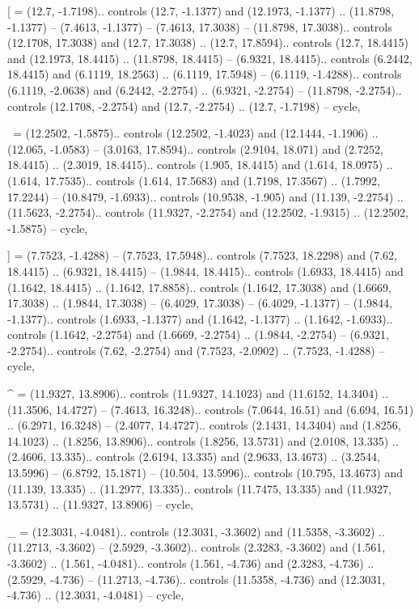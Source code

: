 [ = {(12.7, -1.7198).. controls (12.7, -1.1377) and (12.1973, -1.1377) .. (11.8798, -1.1377) -- (7.4613, -1.1377) -- (7.4613, 17.3038) -- (11.8798, 17.3038).. controls (12.1708, 17.3038) and (12.7, 17.3038) .. (12.7, 17.8594).. controls (12.7, 18.4415) and (12.1973, 18.4415) .. (11.8798, 18.4415) -- (6.9321, 18.4415).. controls (6.2442, 18.4415) and (6.1119, 18.2563) .. (6.1119, 17.5948) -- (6.1119, -1.4288).. controls (6.1119, -2.0638) and (6.2442, -2.2754) .. (6.9321, -2.2754) -- (11.8798, -2.2754).. controls (12.1708, -2.2754) and (12.7, -2.2754) .. (12.7, -1.7198) -- cycle},

\ = {(12.2502, -1.5875).. controls (12.2502, -1.4023) and (12.1444, -1.1906) .. (12.065, -1.0583) -- (3.0163, 17.8594).. controls (2.9104, 18.071) and (2.7252, 18.4415) .. (2.3019, 18.4415).. controls (1.905, 18.4415) and (1.614, 18.0975) .. (1.614, 17.7535).. controls (1.614, 17.5683) and (1.7198, 17.3567) .. (1.7992, 17.2244) -- (10.8479, -1.6933).. controls (10.9538, -1.905) and (11.139, -2.2754) .. (11.5623, -2.2754).. controls (11.9327, -2.2754) and (12.2502, -1.9315) .. (12.2502, -1.5875) -- cycle},

] = {(7.7523, -1.4288) -- (7.7523, 17.5948).. controls (7.7523, 18.2298) and (7.62, 18.4415) .. (6.9321, 18.4415) -- (1.9844, 18.4415).. controls (1.6933, 18.4415) and (1.1642, 18.4415) .. (1.1642, 17.8858).. controls (1.1642, 17.3038) and (1.6669, 17.3038) .. (1.9844, 17.3038) -- (6.4029, 17.3038) -- (6.4029, -1.1377) -- (1.9844, -1.1377).. controls (1.6933, -1.1377) and (1.1642, -1.1377) .. (1.1642, -1.6933).. controls (1.1642, -2.2754) and (1.6669, -2.2754) .. (1.9844, -2.2754) -- (6.9321, -2.2754).. controls (7.62, -2.2754) and (7.7523, -2.0902) .. (7.7523, -1.4288) -- cycle},

^ = {(11.9327, 13.8906).. controls (11.9327, 14.1023) and (11.6152, 14.3404) .. (11.3506, 14.4727) -- (7.4613, 16.3248).. controls (7.0644, 16.51) and (6.694, 16.51) .. (6.2971, 16.3248) -- (2.4077, 14.4727).. controls (2.1431, 14.3404) and (1.8256, 14.1023) .. (1.8256, 13.8906).. controls (1.8256, 13.5731) and (2.0108, 13.335) .. (2.4606, 13.335).. controls (2.6194, 13.335) and (2.9633, 13.4673) .. (3.2544, 13.5996) -- (6.8792, 15.1871) -- (10.504, 13.5996).. controls (10.795, 13.4673) and (11.139, 13.335) .. (11.2977, 13.335).. controls (11.7475, 13.335) and (11.9327, 13.5731) .. (11.9327, 13.8906) -- cycle},

_ = {(12.3031, -4.0481).. controls (12.3031, -3.3602) and (11.5358, -3.3602) .. (11.2713, -3.3602) -- (2.5929, -3.3602).. controls (2.3283, -3.3602) and (1.561, -3.3602) .. (1.561, -4.0481).. controls (1.561, -4.736) and (2.3283, -4.736) .. (2.5929, -4.736) -- (11.2713, -4.736).. controls (11.5358, -4.736) and (12.3031, -4.736) .. (12.3031, -4.0481) -- cycle},

